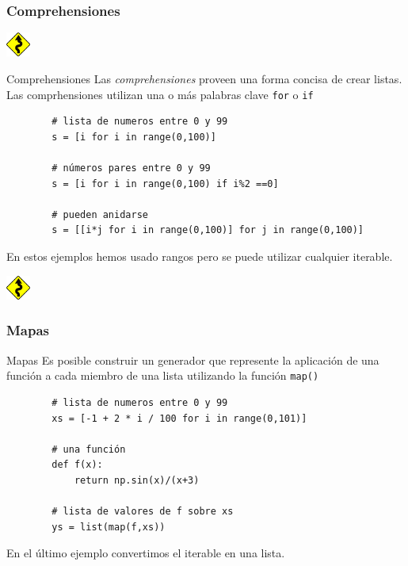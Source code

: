 \documentclass{beamer}
\begin{document}
\begin{frame}[fragile]
    \frametitle{Comprehensiones}
    \includegraphics[height=0.8cm, width=0.8cm]{figuras/sin.png}
    \begin{block}{Comprehensiones}
    Las {\em comprehensiones} proveen una forma concisa de crear listas. Las comprhensiones utilizan
    una o más palabras clave \texttt{for} o \texttt{if}
    \begin{verbatim}
        # lista de numeros entre 0 y 99
        s = [i for i in range(0,100)]

        # números pares entre 0 y 99
        s = [i for i in range(0,100) if i%2 ==0]

        # pueden anidarse
        s = [[i*j for i in range(0,100)] for j in range(0,100)]
    \end{verbatim}
    En estos ejemplos hemos usado rangos pero se puede utilizar cualquier iterable.
    \end{block}

\end{frame}

\begin{frame}[fragile]
    \includegraphics[height=0.8cm, width=0.8cm]{figuras/sin.png}
    \frametitle{Mapas}
    \begin{block}{Mapas}
    Es posible construir un generador que represente la aplicación de una función a cada miembro de una lista
    utilizando la función \texttt{map()}
    \begin{verbatim}
        # lista de numeros entre 0 y 99
        xs = [-1 + 2 * i / 100 for i in range(0,101)]

        # una función
        def f(x):
            return np.sin(x)/(x+3)

        # lista de valores de f sobre xs
        ys = list(map(f,xs))
    \end{verbatim}
    En el último ejemplo convertimos el iterable en una lista.
    \end{block}

\end{frame}
\end{document}
